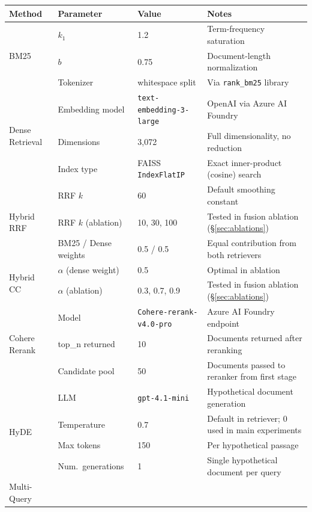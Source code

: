 \documentclass[11pt]{article}
\begin{document}
\begin{table}[ht]
\centering
\small
\begin{tabular}{llll}
\toprule
\textbf{Method} & \textbf{Parameter} & \textbf{Value} & \textbf{Notes} \\
\midrule
\multirow{3}{*}{BM25}
  & $k_1$            & 1.2   & Term-frequency saturation \\
  & $b$              & 0.75  & Document-length normalization \\
  & Tokenizer        & whitespace split & Via \texttt{rank\_bm25} library \\
\midrule
\multirow{3}{*}{Dense Retrieval}
  & Embedding model  & \texttt{text-embedding-3-large} & OpenAI via Azure AI Foundry \\
  & Dimensions       & 3{,}072 & Full dimensionality, no reduction \\
  & Index type       & FAISS \texttt{IndexFlatIP} & Exact inner-product (cosine) search \\
\midrule
\multirow{3}{*}{Hybrid RRF}
  & RRF $k$          & 60    & Default smoothing constant \\
  & RRF $k$ (ablation) & 10, 30, 100 & Tested in fusion ablation (\S\ref{sec:ablations}) \\
  & BM25 / Dense weights & 0.5 / 0.5 & Equal contribution from both retrievers \\
\midrule
\multirow{2}{*}{Hybrid CC}
  & $\alpha$ (dense weight) & 0.5 & Optimal in ablation \\
  & $\alpha$ (ablation)     & 0.3, 0.7, 0.9 & Tested in fusion ablation (\S\ref{sec:ablations}) \\
\midrule
\multirow{3}{*}{Cohere Rerank}
  & Model            & \texttt{Cohere-rerank-v4.0-pro} & Azure AI Foundry endpoint \\
  & top\_n returned  & 10    & Documents returned after reranking \\
  & Candidate pool   & 50    & Documents passed to reranker from first stage \\
\midrule
\multirow{4}{*}{HyDE}
  & LLM              & \texttt{gpt-4.1-mini} & Hypothetical document generation \\
  & Temperature      & 0.7   & Default in retriever; 0 used in main experiments \\
  & Max tokens       & 150   & Per hypothetical passage \\
  & Num.\ generations & 1    & Single hypothetical document per query \\
\midrule
\multirow{4}{*}{Multi-Query}

\end{tabular}
\end{table}
\end{document}
